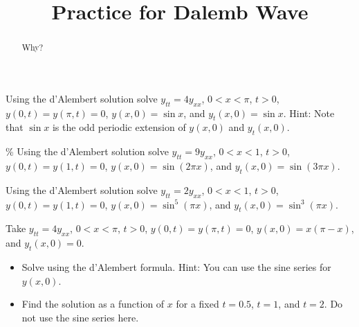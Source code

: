 \documentclass{ximera}
\title{Practice for Dalemb Wave}
\begin{document}
\begin{abstract}
Why?
\end{abstract}
\maketitle


\begin{exercise}
    Using the d'Alembert solution solve $y_{tt} = 4y_{xx}$, $0 < x < \pi$, $t > 0$, $y(0,t) = y(\pi, t) = 0$, $y(x,0) = \sin x$, and $y_t(x,0) = \sin x$.  Hint: Note that $\sin x$ is the odd periodic extension of $y(x,0)$ and $y_t(x,0)$.
\end{exercise}

\begin{exercise}\%
    Using the d'Alembert solution solve $y_{tt} = 9y_{xx}$, $0 < x < 1$, $t > 0$, $y(0,t) = y(1, t) = 0$, $y(x,0) = \sin (2 \pi x)$, and $y_t(x,0) = \sin (3 \pi x)$.
\end{exercise}

\begin{exercise}
    Using the d'Alembert solution solve $y_{tt} = 2y_{xx}$, $0 < x < 1$, $t > 0$, $y(0,t) = y(1, t) = 0$, $y(x,0) = \sin^5 (\pi x)$, and $y_t(x,0) = \sin^3 (\pi x)$.
\end{exercise}

\begin{exercise}
    Take $y_{tt} = 4y_{xx}$, $0 < x < \pi$, $t > 0$, $y(0,t) = y(\pi, t) = 0$, $y(x,0) = x(\pi-x)$, and $y_t(x,0) = 0$.
    \begin{itemize}
        \item Solve using the d'Alembert formula.  Hint: You can use the sine series for $y(x,0)$.
        \item Find the solution as a function of $x$ for a fixed $t=0.5$, $t=1$, and $t=2$.  Do not use the sine series here.
    \end{itemize}
\end{exercise}
\end{document}
